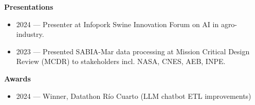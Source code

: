 \documentclass[11pt]{article}
\begin{document}
\vspace{12pt}

\begin{center}
    \textbf{Presentations}
\end{center}

\begin{itemize}[noitemsep, topsep=0pt, partopsep=0pt, parsep=0pt]
    \item 2024 — Presenter at Infopork Swine Innovation Forum on AI in agro-industry.
    \item 2023 — Presented SABIA-Mar data processing at Mission Critical Design Review (MCDR) to stakeholders incl. NASA, CNES, AEB, INPE.
\end{itemize}

\vspace{12pt}

\begin{center}
    \textbf{Awards}
\end{center}

\begin{itemize}[noitemsep, topsep=0pt, partopsep=0pt, parsep=0pt]
    \item 2024 — Winner, Datathon Río Cuarto (LLM chatbot ETL improvements)
\end{itemize}

\vspace{12pt}
\end{document}
